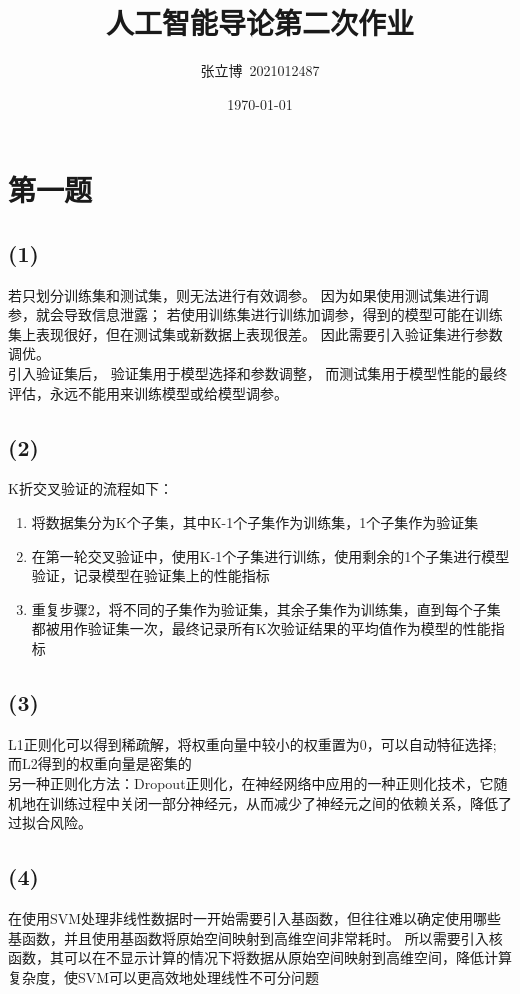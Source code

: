 \documentclass[12pt,a4paper]{article}
\title{\textbf{人工智能导论第二次作业}}
\author{张立博\ 2021012487}
\date{\today}
\begin{document}
\maketitle
\section{第一题}

\subsection*{(1)}
若只划分训练集和测试集，则无法进行有效调参。
因为如果使用测试集进行调参，就会导致信息泄露；
若使用训练集进行训练加调参，得到的模型可能在训练集上表现很好，但在测试集或新数据上表现很差。
因此需要引入验证集进行参数调优。\\
引入验证集后，
验证集用于模型选择和参数调整，
而测试集用于模型性能的最终评估，永远不能用来训练模型或给模型调参。
\subsection*{(2)}
K折交叉验证的流程如下：
\begin{enumerate}
    \item 将数据集分为K个子集，其中K-1个子集作为训练集，1个子集作为验证集
    \item 在第一轮交叉验证中，使用K-1个子集进行训练，使用剩余的1个子集进行模型验证，记录模型在验证集上的性能指标
    \item 重复步骤2，将不同的子集作为验证集，其余子集作为训练集，直到每个子集都被用作验证集一次，最终记录所有K次验证结果的平均值作为模型的性能指标
\end{enumerate}
\subsection*{(3)}
L1正则化可以得到稀疏解，将权重向量中较小的权重置为0，可以自动特征选择;
而L2得到的权重向量是密集的\\
另一种正则化方法：Dropout正则化，在神经网络中应用的一种正则化技术，它随机地在训练过程中关闭一部分神经元，从而减少了神经元之间的依赖关系，降低了过拟合风险。
\subsection*{(4)}
在使用SVM处理非线性数据时一开始需要引入基函数，但往往难以确定使用哪些基函数，并且使用基函数将原始空间映射到高维空间非常耗时。
所以需要引入核函数，其可以在不显示计算的情况下将数据从原始空间映射到高维空间，降低计算复杂度，使SVM可以更高效地处理线性不可分问题
\end{document}
